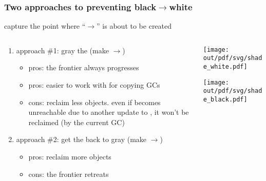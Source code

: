\documentclass[11pt,dvipdfmx]{beamer}
\begin{document}
\begin{frame}
\frametitle{Two approaches to preventing black$\rightarrow$white}
capture the point where ``\blackbox$\rightarrow$\whitebox''
is about to be created
\begin{columns}
\begin{column}{0.75\textwidth}
\begin{enumerate}
\item approach \#1:
  gray the \whitebox (make \blackbox$\rightarrow$\graybox)
  \begin{itemize}
  \item pros: the frontier always progresses
  \item pros: easier to work with for copying GCs
  \item cons: reclaim less objects.
    even if \whitebox becomes unreachable due to another update to \blackbox,
    it won't be reclaimed (by the current GC)
  \end{itemize}
\item approach \#2:
  get the \blackbox back to gray
  (make \graybox$\rightarrow$\whitebox)
  \begin{itemize}
  \item pros: reclaim more objects
  \item cons: the frontier retreats
  \end{itemize}
\end{enumerate}
\end{column}

\begin{column}{0.25\textwidth}
\begin{center}
\texttt{[image: out/pdf/svg/shade\_white.pdf]}

\texttt{[image: out/pdf/svg/shade\_black.pdf]}
\end{center}
\end{column}
\end{columns}
\end{frame}
\fi
\end{document}
